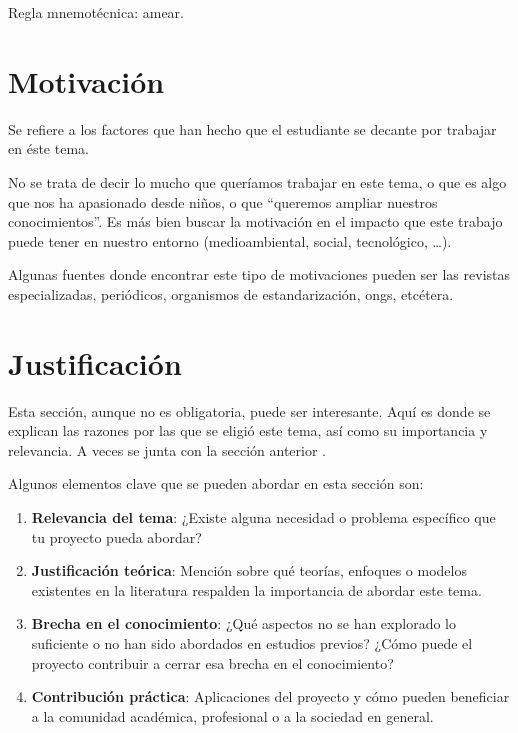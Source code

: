 \documentclass[%
    school=etsisi,%
    degree=61TI,%
]{upm-report}
\begin{document}
Regla mnemotécnica: \gls{amear}.

\section{Motivación}
\label{s:motivacion}

Se refiere a los factores que han hecho que el estudiante se decante por
trabajar en éste tema.

No se trata de decir lo mucho que queríamos trabajar en este tema, o que
es algo que nos ha apasionado desde niños, o que \enquote{queremos
ampliar nuestros conocimientos}. Es más bien buscar la motivación en el
impacto que este trabajo puede tener en nuestro entorno (medioambiental,
social, tecnológico, \ldots).

Algunas fuentes donde encontrar este tipo de motivaciones pueden ser las
revistas especializadas, periódicos, organismos de estandarización,
\glspl{ong}, etcétera.

\section{Justificación}

Esta sección, aunque no es obligatoria, puede ser interesante. Aquí es
donde se explican las razones por las que se eligió este tema, así como
su importancia y relevancia. A veces se junta con la sección anterior
.

Algunos elementos clave que se pueden abordar en esta sección son:

\begin{enumerate}
    \item \textbf{Relevancia del tema}: ¿Existe alguna necesidad o
        problema específico que tu proyecto pueda abordar?
    \item \textbf{Justificación teórica}: Mención sobre qué teorías,
        enfoques o modelos existentes en la literatura respalden la
        importancia de abordar este tema.
    \item \textbf{Brecha en el conocimiento}: ¿Qué aspectos no se han
        explorado lo suficiente o no han sido abordados en estudios
        previos? ¿Cómo puede el proyecto contribuir a cerrar esa brecha
        en el conocimiento?
    \item \textbf{Contribución práctica}: Aplicaciones del proyecto y
        cómo pueden beneficiar a la comunidad académica, profesional o
        a la sociedad en general.
\end{enumerate}
\end{document}
